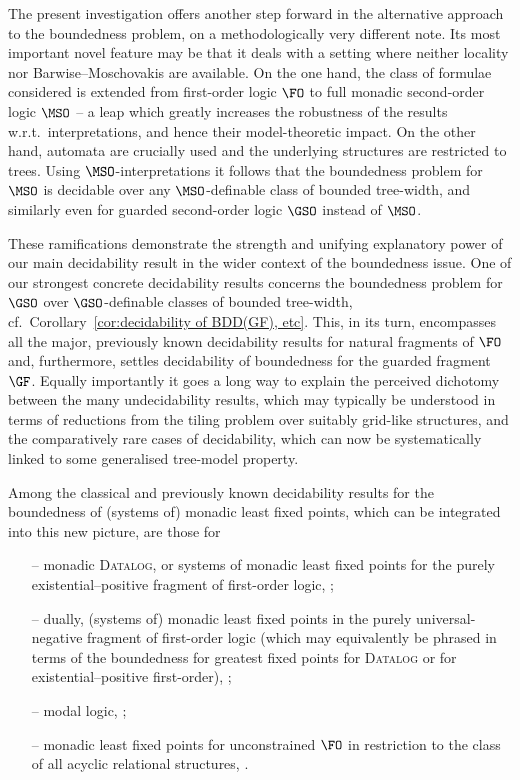 \documentclass{LMCS}
\begin{document}
The present investigation offers another step forward in the alternative
approach to the boundedness problem, on a methodologically very
different note. Its most important novel feature may be that it deals 
with a setting where neither locality nor
Barwise--Moschovakis are available. On the one hand, the class of formulae
considered is extended from first-order logic $\FO$
to full monadic second-order logic $\MSO$ -- a leap which greatly increases
the robustness of the results w.r.t.\ interpretations, and hence
their model-theoretic impact. On the other hand, automata are crucially used
and the underlying structures are restricted to trees.
Using $\MSO$-interpretations it follows that
the boundedness problem for $\MSO$ is decidable
over any $\MSO$-definable class of bounded tree-width, and similarly
even for guarded second-order logic $\GSO$ instead of $\MSO$.

These ramifications demonstrate the strength and unifying explanatory
power of our main decidability result in the wider context of the
boundedness issue.
One of our strongest concrete decidability results
concerns the boundedness problem for $\GSO$ over
$\GSO$-definable classes of bounded tree-width, cf.~Corollary~\ref{cor:decidability of BDD(GF), etc}.
This, in its turn,
encompasses all the major, previously known decidability results
for natural fragments of $\FO$ and, furthermore, settles decidability
of boundedness for the guarded fragment $\GF$.
Equally importantly it goes a long way
to explain the perceived dichotomy between the many undecidability
results, which may typically be understood in terms of reductions from
the tiling problem over suitably grid-like structures, and the
comparatively rare cases of decidability, which can now be systematically
linked to some generalised tree-model property.

Among the classical and previously known decidability results
for the boundedness of (systems of) monadic least fixed points,
which can be integrated into this new picture, are those for
\begin{itemize}
\item[--] monadic \textsc{Datalog,} or systems of monadic least fixed points
  for the purely existential--positive fragment of first-order logic,
  \cite{CosmadakisGaKaVa88}\?;
\item[--] dually, (systems of) monadic least fixed points
  in the purely universal-negative fragment of first-order logic
  (which may equivalently be phrased in terms of the
  boundedness for greatest fixed points for \textsc{Datalog} or for
  existential--positive first-order), \cite{Otto06}\?;
\item[--] modal logic, \cite{Otto99}\?;
\item[--] monadic least fixed points for unconstrained $\FO$
  in restriction to the class of all acyclic relational structures, \cite{KOS}.
\end{itemize}
\end{document}
